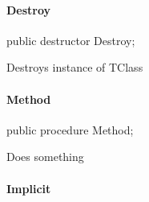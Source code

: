 \documentclass{report}
\begin{document}
\paragraph*{Destroy}\hspace*{\fill}

\begin{list}{}{
\setlength{\itemindent}{0cm}
\setlength{\listparindent}{0cm}
\setlength{\leftmargin}{\evensidemargin}
\addtolength{\leftmargin}{\tmplength}
\settowidth{\labelsep}{X}
\addtolength{\leftmargin}{\labelsep}
\setlength{\labelwidth}{\tmplength}
}
\begin{flushleft}
\item[\textbf{Declaration}\hfill]
\begin{ttfamily}
public destructor Destroy;\end{ttfamily}


\end{flushleft}
\par
\item[\textbf{Description}]
Destroys instance of TClass

\end{list}
\paragraph*{Method}\hspace*{\fill}

\begin{list}{}{
\setlength{\itemindent}{0cm}
\setlength{\listparindent}{0cm}
\setlength{\leftmargin}{\evensidemargin}
\addtolength{\leftmargin}{\tmplength}
\settowidth{\labelsep}{X}
\addtolength{\leftmargin}{\labelsep}
\setlength{\labelwidth}{\tmplength}
}
\begin{flushleft}
\item[\textbf{Declaration}\hfill]
\begin{ttfamily}
public procedure Method;\end{ttfamily}


\end{flushleft}
\par
\item[\textbf{Description}]
Does something

\end{list}
\paragraph*{Implicit}\hspace*{\fill}
\end{document}

